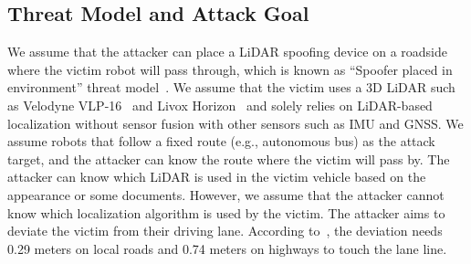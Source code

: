 \subsection{Threat Model and Attack Goal}
We assume that the attacker can place a LiDAR spoofing device on a roadside where the victim robot will pass through, which is known as ``Spoofer placed in environment'' threat model~\cite{hallyburton2022security}. We assume that the victim uses a 3D LiDAR such as Velodyne VLP-16~\cite{VLP16} and Livox Horizon~\cite{livox_horizon} and solely relies on LiDAR-based localization without sensor fusion with other sensors such as IMU and GNSS.  
We assume robots that follow a fixed route (e.g., autonomous bus) as the attack target, and the attacker can know the route where the victim will pass by.
The attacker can know which LiDAR is used in the victim vehicle based on the appearance or some documents. However, we assume that the attacker cannot know which localization algorithm is used by the victim. The attacker aims to deviate the victim from their driving lane. According to~\cite{sato2021dirty}, the deviation needs 0.29 meters on local roads and 0.74 meters on highways to touch the lane line.

